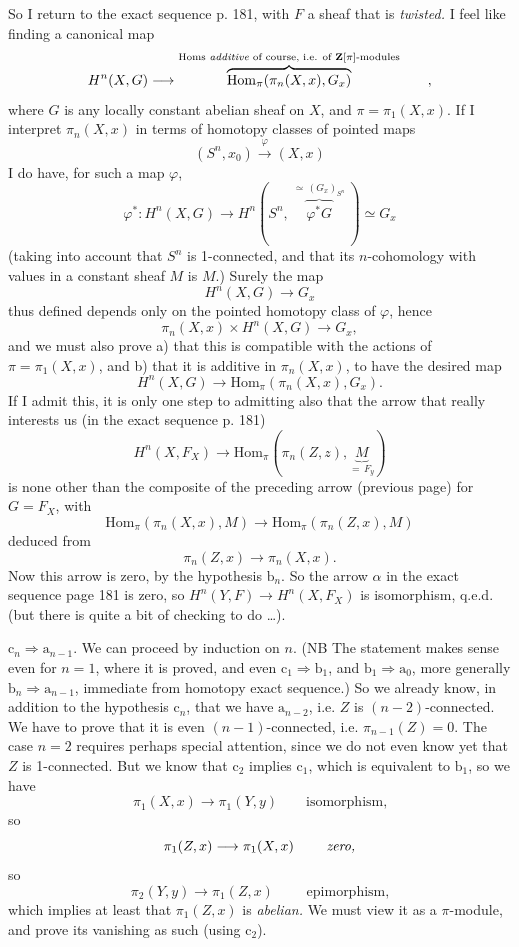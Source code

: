 \documentclass[11pt]{article}
\newcommand{\printedpage}[1]{\marginpar{\footnotesize p.~#1}}
\newcommand{\msp}[1]{\marginpar{\footnotesize [#1]}}
\begin{document}
So I return to the exact sequence p. 181, with $F$ a sheaf that is \textit{twisted.} I feel like finding a canonical map
\[
H^n(X,G) \longrightarrow \overbrace{\mathrm{Hom}_\pi(\pi_n(X,x),G_x)}^{\text{\scriptsize Homs \textit{additive} of course, i.e. of $\mathbf{Z}[\pi]$-modules}} \qquad ,
\]
where $G$ is any locally constant abelian sheaf on $X$, and $\pi = \pi_1(X,x)$. If I interpret
\msp{page 184}
$\pi_n(X,x)$ in terms of homotopy classes of pointed maps
\[
(S^n,x_0) \xrightarrow{\ \varphi\ } (X,x)
\]
I do have, for such a map $\varphi$,
\[
\varphi^* : H^n(X,G) \longrightarrow H^n(S^n,\ \overbrace{\varphi^*G}^{\simeq\,(G_x)_{S^n}}\ ) \simeq G_x
\]
(taking into account that $S^n$ is 1-connected, and that its $n$-cohomology with values in a constant sheaf $M$ is $M$.) Surely the map
\[
H^n(X,G) \longrightarrow G_x
\]
\printedpage{123}
thus defined depends only on the pointed homotopy class of $\varphi$, hence
\[
\pi_n(X,x) \times H^n(X,G) \longrightarrow G_x,
\]
and we must also prove a) that this is compatible with the actions of $\pi = \pi_1(X,x)$, and b) that it is additive in $\pi_n(X,x)$, to have the desired map
\[
H^n(X,G) \longrightarrow \mathrm{Hom}_\pi(\pi_n(X,x),G_x).
\]
If I admit this, it is only one step to admitting also that the arrow that really interests us (in the exact sequence p. 181)
\msp{page 185}
\[
H^n(X,F_X) \longrightarrow \mathrm{Hom}_\pi(\pi_n(Z,z),\underbrace{M}_{=\,F_y})
\]
is none other than the composite of the preceding arrow (previous page) for $G = F_X$, with
\[
\mathrm{Hom}_\pi(\pi_n(X,x),M) \longrightarrow \mathrm{Hom}_\pi(\pi_n(Z,x),M)
\]
deduced from
\[
\pi_n(Z,x) \longrightarrow \pi_n(X,x).
\]
Now this arrow is zero, by the hypothesis $\mathrm{b}_n$. So the arrow $\alpha$ in the exact sequence page 181 is zero, so $H^n(Y,F) \longrightarrow H^n(X,F_X)$ is isomorphism, q.e.d. (but there is quite a bit of checking to do \dots).

$\mathrm{c}_n \Longrightarrow \mathrm{a}_{n-1}$. We can proceed by induction on $n$. (NB The statement makes sense even for $n=1$, where it is proved, and even $\mathrm{c}_1 \Longrightarrow \mathrm{b}_1$, and $\mathrm{b}_1 \Longrightarrow \mathrm{a}_0$, more generally $\mathrm{b}_n \Longrightarrow \mathrm{a}_{n-1}$, immediate from homotopy exact sequence.) So we already know, in addition to the hypothesis $\mathrm{c}_n$, that we have $\mathrm{a}_{n-2}$, i.e. $Z$ is $(n-2)$-connected. We have to prove that it is even $(n-1)$-connected, i.e. $\pi_{n-1}(Z)=0$. The case $n=2$ requires %
\msp{page 186}
perhaps special attention, since we do not even know yet that $Z$ is 1-connected. But we know that $\mathrm{c}_2$ implies $\mathrm{c}_1$, which is equivalent to $\mathrm{b}_1$, so we have
\[
\pi_1(X,x) \longrightarrow \pi_1(Y,y) \qquad \text{isomorphism,}
\]
so
\[
\pi_1(Z,x) \longrightarrow \pi_1(X,x) \qquad \text{ \textit{zero,}}
\]
so
\[
\pi_2(Y,y) \longrightarrow \pi_1(Z,x) \qquad \text{ epimorphism,}
\]
which implies at least that $\pi_1(Z,x)$ is \textit{abelian.} We must view it as a $\pi$-module, and prove its vanishing as such (using $\mathrm{c}_2$).
\end{document}
